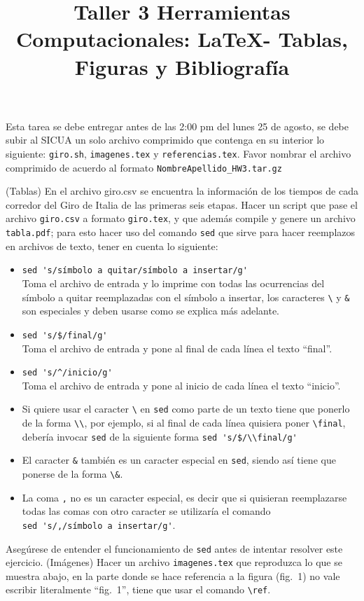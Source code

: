 \documentclass[12pt, letter]{exam}
\date{}
\title{\begin{LARGE}
{Taller 3 Herramientas Computacionales: \LaTeX - Tablas, Figuras y Bibliograf\'ia}
\end{LARGE}}
\begin{document}
\maketitle


Esta tarea se debe entregar antes de las 2:00 pm del lunes 25 de agosto, se debe subir al SICUA un solo archivo comprimido que contenga en su interior lo siguiente: \verb'giro.sh', \verb'imagenes.tex' y \verb'referencias.tex'. Favor nombrar el archivo comprimido de acuerdo al formato \verb'NombreApellido_HW3.tar.gz'\\

\begin{questions}

\question (Tablas) En el archivo giro.csv se encuentra la informaci\'on de los tiempos de cada corredor del Giro de Italia de las primeras seis etapas.
Hacer un script que pase el archivo \verb"giro.csv" a formato \verb"giro.tex", y que además compile y genere un archivo \verb"tabla.pdf"; para
esto hacer uso del comando \verb+sed+ que sirve para hacer reemplazos en archivos de texto, tener en cuenta lo siguiente:

\begin{itemize}
\item \verb"sed 's/símbolo a quitar/símbolo a insertar/g'" \\
Toma el archivo de entrada y lo imprime con todas las ocurrencias del símbolo a quitar reemplazadas con el símbolo a insertar, los caracteres \verb+\+ y \verb+&+ son especiales y deben usarse como se explica más adelante.
\item \verb"sed 's/$/final/g'" \\
Toma el archivo de entrada y pone al final de cada línea el texto ``final''.
\item \verb"sed 's/^/inicio/g'" \\
Toma el archivo de entrada y pone al inicio de cada línea el texto ``inicio''.
\item Si quiere usar el caracter \verb+\+ en \verb+sed+ como parte de un texto tiene que ponerlo de la forma \verb+\\+, por ejemplo, si al final de cada línea quisiera poner \verb+\final+, debería invocar \verb+sed+ de la siguiente forma \verb+sed 's/$/\\final/g'+
\item El caracter \verb+&+ también es un caracter especial en \verb+sed+, siendo así tiene que ponerse de la forma \verb+\&+.
\item La coma \verb+,+  no es un caracter especial, es decir que si quisieran reemplazarse todas las comas con otro caracter se utilizaría el comando \\ \verb+sed 's/,/símbolo a insertar/g'+.
\end{itemize}
Asegúrese de entender el funcionamiento de \verb+sed+ antes de intentar resolver este ejercicio.
\newpage
\question (Imágenes) Hacer un archivo \verb"imagenes.tex" que reproduzca lo que se muestra abajo, en la parte donde se hace referencia a la figura (fig.\ 1) no vale escribir literalmente ``fig.\ 1'', tiene que usar el comando \verb+\ref+. 


\end{questions}
\end{document}
